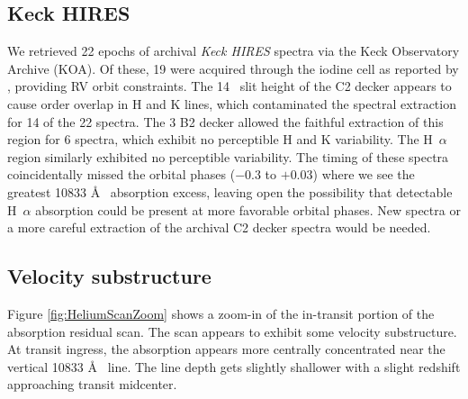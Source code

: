 \documentclass[twocolumn]{aastex631}
\begin{document}
\subsection{Keck HIRES}
We retrieved 22 epochs of archival \emph{Keck HIRES} spectra via the Keck Observatory Archive (KOA). Of these, 19 were acquired through the iodine cell as reported by \citet{2017AJ....153..211Z}, providing RV orbit constraints.  The 14\arcsec~ slit height of the C2 decker appears to cause order overlap in  H and K lines, which contaminated the spectral extraction for 14 of the 22 spectra.  The 3 B2 decker allowed the faithful extraction of this region for 6 spectra, which exhibit no perceptible  H and K variability.  The H~$\alpha$ region similarly exhibited no perceptible variability.  The timing of these spectra coincidentally missed the orbital phases ($-0.3$ to $+0.03$) where we see the greatest  10833 \AA~ absorption excess, leaving open the possibility that detectable H~$\alpha$ absorption could be present at more favorable orbital phases.  New spectra or a more careful extraction of the archival C2 decker spectra would be needed.


\subsection{Velocity substructure}
Figure \ref{fig:HeliumScanZoom} shows a zoom-in of the in-transit portion of the absorption residual scan.  The scan appears to exhibit some velocity substructure.  At transit ingress, the absorption appears more centrally concentrated near the vertical 10833 \AA~ line.  The line depth gets slightly shallower with a slight redshift approaching transit midcenter.
\end{document}
